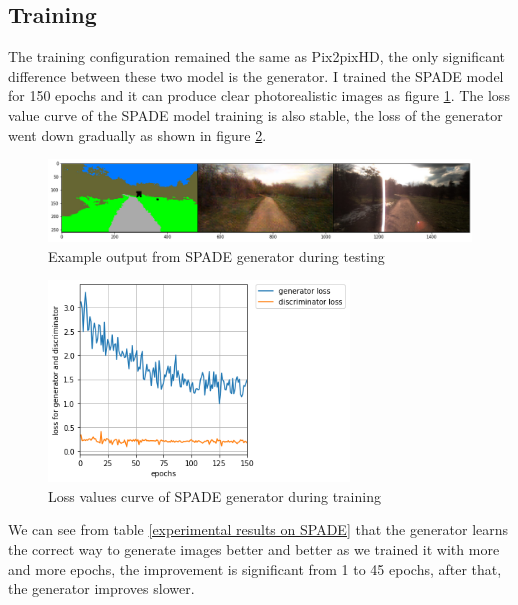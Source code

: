 \subsection{Training}
The training configuration remained the same as Pix2pixHD, the only significant difference between 
these two model is the generator. I trained the SPADE model for 150 epochs and it can produce 
clear photorealistic images as figure \ref{fig:SPADE-output}. The loss value curve of 
the SPADE model training is also stable, the loss of the generator went down gradually as shown 
in figure \ref{fig:SPADE-loss}. 
\begin{figure}
    \begin{center}
    \includegraphics[width=14cm]{figures/SPADE-output}
    \end{center}
    \caption{Example output from SPADE generator during testing}
    \label{fig:SPADE-output}
\end{figure}
\begin{figure}
    \begin{center}
    \includegraphics[width=8cm]{figures/SPADE-loss}
    \end{center}
    \caption{Loss values curve of SPADE generator during training}
    \label{fig:SPADE-loss}
\end{figure}
We can see from table \ref{experimental results on SPADE} that the generator learns the correct way to generate images better 
and better as we trained it with more and more epochs, the improvement is significant from 1 to 
45 epochs, after that, the generator improves slower.
